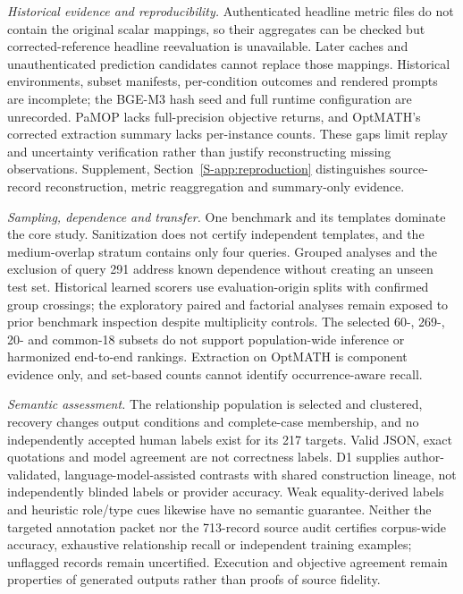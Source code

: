 \documentclass[pdflatex,sn-basic,Numbered]{sn-jnl}
\begin{document}
\emph{Historical evidence and reproducibility.} Authenticated headline metric files do not contain the original scalar mappings, so their aggregates can be checked but corrected-reference headline reevaluation is unavailable. Later caches and unauthenticated prediction candidates cannot replace those mappings. Historical environments, subset manifests, per-condition outcomes and rendered prompts are incomplete; the BGE-M3 hash seed and full runtime configuration are unrecorded. PaMOP lacks full-precision objective returns, and OptMATH's corrected extraction summary lacks per-instance counts. These gaps limit replay and uncertainty verification rather than justify reconstructing missing observations. Supplement, Section~\ref{S-app:reproduction} distinguishes source-record reconstruction, metric reaggregation and summary-only evidence.

\emph{Sampling, dependence and transfer.} One benchmark and its templates dominate the core study. Sanitization does not certify independent templates, and the medium-overlap stratum contains only four queries. Grouped analyses and the exclusion of query 291 address known dependence without creating an unseen test set. Historical learned scorers use evaluation-origin splits with confirmed group crossings; the exploratory paired and factorial analyses remain exposed to prior benchmark inspection despite multiplicity controls. The selected 60-, 269-, 20- and common-18 subsets do not support population-wide inference or harmonized end-to-end rankings. Extraction on OptMATH is component evidence only, and set-based counts cannot identify occurrence-aware recall.

\emph{Semantic assessment.} The relationship population is selected and clustered, recovery changes output conditions and complete-case membership, and no independently accepted human labels exist for its 217 targets. Valid JSON, exact quotations and model agreement are not correctness labels. D1 supplies author-validated, language-model-assisted contrasts with shared construction lineage, not independently blinded labels or provider accuracy. Weak equality-derived labels and heuristic role/type cues likewise have no semantic guarantee. Neither the targeted annotation packet nor the 713-record source audit certifies corpus-wide accuracy, exhaustive relationship recall or independent training examples; unflagged records remain uncertified. Execution and objective agreement remain properties of generated outputs rather than proofs of source fidelity.
\end{document}
